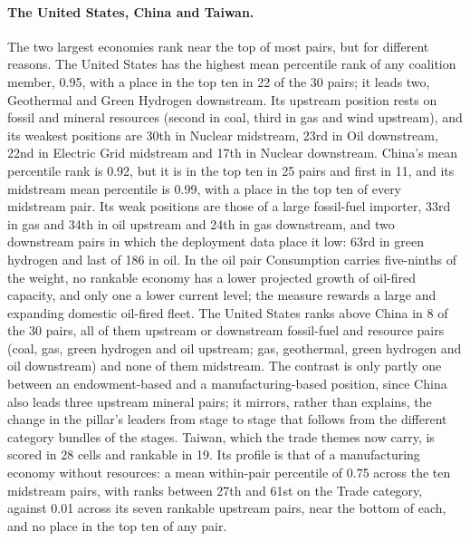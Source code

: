 \paragraph{The United States, China and Taiwan.} The two largest economies rank near the top of
most pairs, but for different reasons. The United States has the highest mean percentile rank
of any coalition member, 0.95, with a place in the top ten in 22 of the 30 pairs; it leads two,
Geothermal and Green Hydrogen downstream. Its upstream position rests on fossil and mineral
resources (second in coal, third in gas and wind upstream), and its weakest positions are 30th
in Nuclear midstream, 23rd in Oil downstream, 22nd in Electric Grid midstream and 17th in
Nuclear downstream. China's mean percentile rank is 0.92, but it is in the top ten in 25 pairs
and first in 11, and its midstream mean percentile is 0.99, with a place in the top ten of
every midstream pair. Its weak positions are those of a large fossil-fuel importer, 33rd in gas
and 34th in oil upstream and 24th in gas downstream, and two downstream pairs in which the
deployment data place it low: 63rd in green hydrogen and last of 186 in oil. In the oil pair
Consumption carries five-ninths of the weight, no rankable economy has a lower projected growth
of oil-fired capacity, and only one a lower current level; the measure rewards a large and
expanding domestic oil-fired fleet. The United States ranks above China in 8 of the 30 pairs,
all of them upstream or downstream fossil-fuel and resource pairs (coal, gas, green hydrogen and
oil upstream; gas, geothermal, green hydrogen and oil downstream) and none of them midstream.
The contrast is only partly one between an endowment-based and a manufacturing-based position,
since China also leads three upstream mineral pairs; it mirrors, rather than explains, the
change in the pillar's leaders from stage to stage that follows from the different category
bundles of the stages. Taiwan, which the trade themes now carry, is scored in 28 cells and
rankable in 19. Its profile is that of a manufacturing economy without resources: a mean
within-pair percentile of 0.75 across the ten midstream pairs, with ranks between 27th and 61st
on the Trade category, against 0.01 across its seven rankable upstream pairs, near the bottom of
each, and no place in the top ten of any pair.


